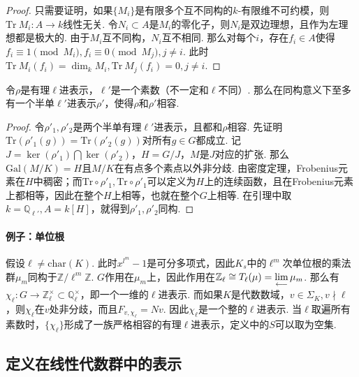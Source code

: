 \begin{proof}
    只需要证明，如果$\{M_i\}$是有限多个互不同构的$k$-有限维不可约模，则$\mathrm{Tr}\ M_i: A\to k$线性无关. 令$N_i\subset A$是$M_i$的零化子，则$N_i$是双边理想，且作为左理想都是极大的. 由于$M_i$互不同构，$N_i$互不相同. 那么对每个$i$，存在$f_i\in A$使得$f_i\equiv 1\pmod{M_i}, f_i\equiv 0\pmod{M_j}, j\neq i$. 此时$\mathrm{Tr}\ M_i(f_i) = \dim_k M_i, \mathrm{Tr}\ M_j(f_i) = 0, j\neq i$.
\end{proof}

\begin{cthm}
    令$\rho$是有理$\ell$进表示，$\ell'$是一个素数（不一定和$\ell$不同）. 那么在同构意义下至多有一个半单$\ell'$进表示$\rho'$，使得$\rho$和$\rho'$相容.
\end{cthm}

\begin{proof}
    令$\rho'_1, \rho'_2$是两个半单有理$\ell'$进表示，且都和$\rho$相容. 先证明$\mathrm{Tr}(\rho'_1(g)) = \mathrm{Tr}(\rho'_2(g))$对所有$g\in G$都成立. 记$J = \ker(\rho'_1)\bigcap \ker(\rho'_2)$，$H = G/J$，$M$是$J$对应的扩张. 那么$\mathrm{Gal}(M/K) = H$且$M/K$在有点多个素点以外非分歧. 由\Chebotarev 密度定理，Frobenius元素在$H$中稠密；而$\mathrm{Tr}\circ \rho'_1, \mathrm{Tr}\circ \rho'_1$可以定义为$H$上的连续函数，且在Frobenius元素上都相等，因此在整个$H$上相等，也就在整个$G$上相等. 在引理中取$k = \mathbb{Q}_{\ell'}, A = k[H]$，就得到$\rho'_1, \rho'_2$同构.
\end{proof}

\paragraph{例子：单位根}
假设$\ell\neq \mathrm{char}(K)$. 此时$x^{l^m}-1$是可分多项式，因此$K_s$中的$\ell^m$次单位根的乘法群$\mu_m$同构于$\mathbb{Z}/\ell^m \mathbb{Z}$. $G$作用在$\mu_m$上，因此作用在$\mathbb{Z}_{\ell} \cong T_{\ell}(\mu) = \lim\limits_{\longleftarrow}\mu_m$. 那么有$\chi_{\ell}:G\to \mathbb{Z}_{\ell}^{\times}\subset \mathbb{Q}_{\ell}^{\times}$，即一个一维的$\ell$进表示. 而如果$K$是代数数域，$v\in \Sigma_K, v\nmid \ell$，则$\chi_{\ell}$在$v$处非分歧，而且$F_{v, \chi_{\ell}} = Nv$. 因此$\chi_{\ell}$是一个整的$\ell$进表示. 当$\ell$取遍所有素数时，$\{\chi_{\ell}\}$形成了一族严格相容的有理$\ell$进表示，定义中的$S$可以取为空集.

\subsection{定义在线性代数群中的表示}

